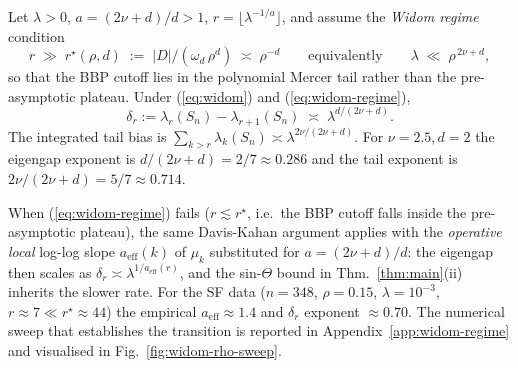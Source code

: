 \begin{lemma}\label{lem:eigengap}
Let $\lambda>0$, $a=(2\nu+d)/d>1$, $r=\lfloor\lambda^{-1/a}\rfloor$, and assume
the \emph{Widom regime} condition
\begin{equation}\label{eq:widom-regime}
r \;\gg\; r^\star(\rho,d) \;:=\; |D|/(\omega_d\,\rho^d)
\;\asymp\; \rho^{-d}\qquad\text{equivalently}\qquad
\lambda \;\ll\; \rho^{\,2\nu+d},
\end{equation}
so that the BBP cutoff lies in the polynomial Mercer tail rather than the
pre-asymptotic plateau. Under (\ref{eq:widom}) and (\ref{eq:widom-regime}),
\begin{equation}\label{eq:eigengap-bbp}
\delta_r:=\lambda_r(S_n)-\lambda_{r+1}(S_n)\;\asymp\;\lambda^{d/(2\nu+d)}.
\end{equation}
The integrated tail bias is
$\sum_{k>r}\lambda_k(S_n)\asymp\lambda^{2\nu/(2\nu+d)}$. For $\nu=2.5,d=2$
the eigengap exponent is $d/(2\nu+d)=2/7\approx 0.286$ and the tail exponent
is $2\nu/(2\nu+d)=5/7\approx 0.714$.

When (\ref{eq:widom-regime}) fails ($r\lesssim r^\star$, i.e.\ the BBP cutoff
falls inside the pre-asymptotic plateau), the same Davis-Kahan argument applies
with the \emph{operative local} log-log slope $a_{\mathrm{eff}}(k)$ of $\mu_k$
substituted for $a=(2\nu+d)/d$: the eigengap then scales as
$\delta_r\asymp\lambda^{1/a_{\mathrm{eff}}(r)}$, and the sin-$\Theta$ bound in
Thm.~\ref{thm:main}(ii) inherits the slower rate. For the SF data
($n=348$, $\rho=0.15$, $\lambda=10^{-3}$, $r\approx 7\ll r^\star\approx 44$) the
empirical $a_{\mathrm{eff}}\approx 1.4$ and $\delta_r$ exponent $\approx 0.70$.
The numerical sweep that establishes the transition is reported in
Appendix~\ref{app:widom-regime} and visualised in
Fig.~\ref{fig:widom-rho-sweep}.
\end{lemma}

